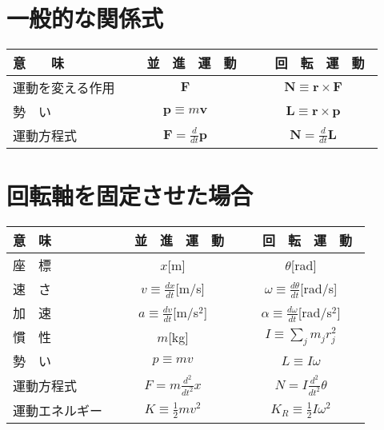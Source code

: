\documentclass[b5j,10pt]{jarticle}
\def\ds{\displaystyle}
\begin{document}
\section*{一般的な関係式}


\def\arraystretch{2}
\begin{tabular}{|p{27mm}||c|c|} \hline
\hfil 意　　味	& 　並　進　運　動　	& 　回　転　運　動　 \\ \hline\hline
運動を変える作用	& $\bm{F}$	& $\bm{N} \equiv \bm{r} \times \bm{F} $ \\ \hline
\hfil 勢　い	& $\bm{p} \equiv m \bm{v}$	& $\bm{L} \equiv \bm{r}\times \bm{p} $ \\ \hline
\hfil 運動方程式	& $\ds \bm{F} = \frac{d}{dt} \bm{p}$	& $\ds \bm{N} = \frac{d}{dt} \bm{L}$ \\ \hline
\end{tabular}



\section*{回転軸を固定させた場合}




\def\arraystretch{2}
\begin{tabular}{|p{27mm}||c|c|} \hline
\hfil 意　味	& 　並　進　運　動　	& 　回　転　運　動　 \\ \hline\hline
\hfil 座　標	& $x$[m]	& $\theta$[rad] \\ \hline
\hfil 速　さ	& $\ds v \equiv \frac{dx}{dt}$[m/s]	& $\ds \omega \equiv \frac{d \theta}{dt}$[rad/s] \\ \hline
\hfil 加　速	& $\ds a \equiv \frac{dv}{dt}$[m/s$^2$]	& $\ds \alpha \equiv \frac{d \omega}{dt}$[rad/s$^2$] \\ \hline
\hfil 慣　性	& $m$[kg]	& $\ds I \equiv \sum_j m_j r_j^2$ \\ \hline
\hfil 勢　い	& $p \equiv m v$	& $L \equiv I \omega $ \\ \hline
\hfil 運動方程式	& $\ds F = m \frac{d^2}{dt^2}x$	& $\ds N = I \frac{d^2}{dt^2} \theta$ \\ \hline
\hfil 運動エネルギー	& $\ds K \equiv \frac{1}{2} m v^2$	& $\ds K_R \equiv \frac{1}{2} I \omega^2$ \\ \hline
\end{tabular}
\end{document}
